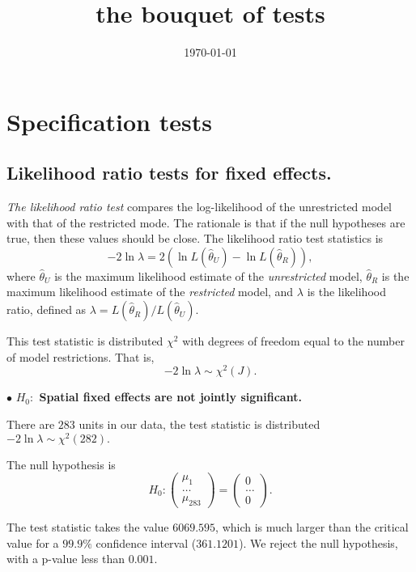 \documentclass[11pt,a4paper]{amsart}
\theoremstyle{plain}
\theoremstyle{definition}
\begin{document}
\title{the bouquet of tests}
\date{\today}
\maketitle
\tableofcontents
\newpage
		
\section {Specification tests}
\subsection{Likelihood ratio tests for fixed effects. }\hfill\par
		
\textit{The likelihood ratio test} compares the log-likelihood of the unrestricted model with that of the restricted mode. The rationale is that if the null hypotheses are true, then these values should be close. The likelihood ratio test statistics is 
\[	-2 \ln \lambda = 2(\ln L(\hat{\theta}_{U}) - \ln L(\hat{\theta}_{R}) ),	\]
where $\hat{\theta}_{U}$ is the maximum likelihood estimate of the \emph{unrestricted} model, $\hat{\theta}_{R}$ is the maximum likelihood estimate of the \emph{restricted} model, and $\lambda$ is the likelihood ratio, defined as $\lambda = L(\hat{\theta}_{R}) / L(\hat{\theta}_{U})$.
		
This test statistic is distributed $\chi^{2}$ with degrees of freedom equal to the number of model restrictions. That is,
	\[	-2 \ln \lambda \sim \chi^{2}(J).	\]
		
$\bullet$ \textbf{$H_{0}:$ Spatial fixed effects are not jointly significant.} 
		
There are $283$ units in our data, the test statistic is distributed  $-2 \ln \lambda \sim \chi^{2}(282).$
		
The null hypothesis is 
\[	H_{0}: \begin{pmatrix}
		\mu_{1} \\
		\dots \\
		\mu_{283}
\end{pmatrix} = \begin{pmatrix}
		0 \\
		\dots \\
		0
\end{pmatrix}.	\]
		
The test statistic takes the value $6069.595$, which is much larger than the critical value for a $99.9\%$ confidence interval ($361.1201$). We reject the null hypothesis,  with a p-value less than $0.001$.
\end{document}
